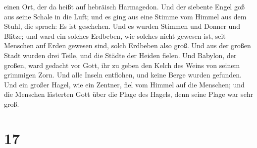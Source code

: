 einen Ort, der da heißt auf hebräisch Harmagedon.  Und der
siebente Engel goß aus seine Schale in die Luft; und es ging aus eine
Stimme vom Himmel aus dem Stuhl, die sprach: Es ist geschehen.
 Und es wurden Stimmen und Donner und Blitze; und ward ein
solches Erdbeben, wie solches nicht gewesen ist, seit Menschen auf Erden
gewesen sind, solch Erdbeben also groß.  Und aus der großen
Stadt wurden drei Teile, und die Städte der Heiden fielen. Und Babylon,
der großen, ward gedacht vor Gott, ihr zu geben den Kelch des Weins von
seinem grimmigen Zorn.  Und alle Inseln entflohen, und
keine Berge wurden gefunden.  Und ein großer Hagel, wie ein
Zentner, fiel vom Himmel auf die Menschen; und die Menschen lästerten
Gott über die Plage des Hagels, denn seine Plage war sehr groß.

\hypertarget{section-16}{%
\section{17}\label{section-16}}

